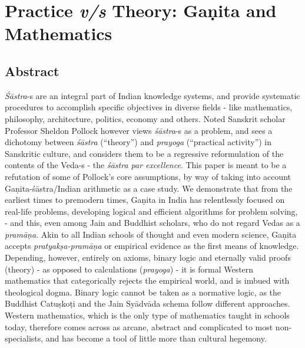 \chapter[Practice {\sl  v/s} Theory: Gaṇita and...]{Practice {\sl\bfseries v/s} Theory: Gaṇita and Mathematics}\label{chapter3}


\section*{Abstract}

{\sl Śāstra}-s are an integral part of Indian knowledge systems, and provide systematic procedures to accomplish specific objectives in diverse fields - like mathematics, philosophy, architecture, politics, economy and others. Noted Sanskrit scholar Professor Sheldon Pollock however views {\sl śāstra}-s as a problem, and sees a dichotomy between {\sl śāstra} (``theory'') and {\sl prayoga} (``practical activity'') in Sanskritic culture, and considers them to be a regressive reformulation of the contents of the Veda-s - the {\sl śāstra par excellence}. This paper is meant to be a refutation of some of Pollock's core assumptions, by way of taking into account Gaṇita-śāstra/Indian arithmetic as a case study. We demonstrate that from the earliest times to premodern times, Gaṇita in India has relentlessly focused on real-life problems, developing logical and efficient algorithms for problem solving, - and this, even among Jain and Buddhist scholars, who do not regard Vedas as a {\sl pramāṇa}. Akin to all Indian schools of thought and even modern science, Gaṇita accepts {\sl pratyakṣa-pramāṇa} or empirical evidence as the first means of knowledge. Depending, however, entirely on axioms, binary logic and eternally valid proofs (theory) - as opposed to calculations ({\sl prayoga}) -  it is formal Western mathematics that categorically rejects the empirical world, and is imbued with theological dogma. Binary logic cannot be taken as a normative logic, as the Buddhist Catuṣkoṭi and the Jain Syādvāda schema follow different approaches. Western mathematics, which is the only type of mathematics taught in schools today, therefore comes across as arcane, abstract and complicated to most non-specialists, and has become a tool of little more than cultural hegemony.  

